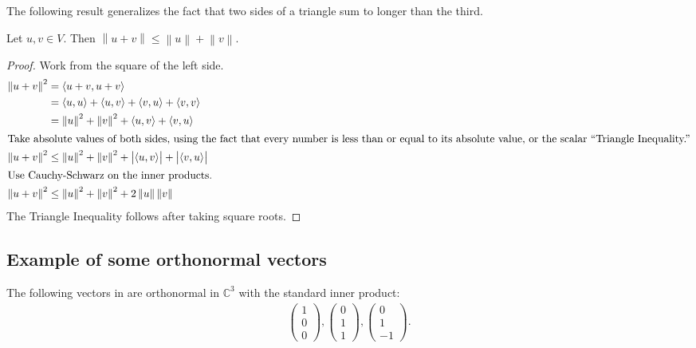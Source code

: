 The following result generalizes the fact that two sides of a triangle sum to longer than the third.
\begin{theorem}
Let \(u, v \in V\). Then \(\left\|u+v\right\| \leq \left\|u\right\| + \left\|v\right\|\).
\end{theorem}
\begin{proof}
  Work from the square of the left side.
  \begin{align}
    \left\|u + v\right\|^2
    &= \left\langle u + v, u + v\right\rangle\\
    &= \left\langle u, u\right\rangle + \left\langle u, v\right\rangle
     + \left\langle v, u\right\rangle + \left\langle v, v\right\rangle\\
    &= \left\|u\right\|^2 + \left\|v\right\|^2
      + \left\langle u, v\right\rangle
      + \left\langle v, u\right\rangle\\
    \intertext{Take absolute values of both sides, using the fact that every number is less than or equal to its absolute value, or the scalar ``Triangle Inequality.''}
    \left\|u + v\right\|^2
    &\leq
    \left\|u\right\|^2 + \left\|v\right\|^2
      + \left|\left\langle u, v\right\rangle\right|
      + \left|\left\langle v, u\right\rangle\right|\\
    \intertext{Use Cauchy-Schwarz on the inner products.}
    \left\|u + v\right\|^2
    &\leq
    \left\|u\right\|^2 + \left\|v\right\|^2
    + 2\left\|u\right\|\left\|v\right\|
  \end{align}
  The Triangle Inequality follows after taking square roots.
\end{proof}

\subsection{Example of some orthonormal vectors}
The following vectors in are orthonormal in \(\mathbb{C}^3\) with the standard inner product:
\begin{align*}
  \begin{pmatrix}
    1 \\ 0 \\ 0
  \end{pmatrix},
  \begin{pmatrix}
    0 \\ 1 \\ 1
  \end{pmatrix},
  \begin{pmatrix}
    0 \\ 1 \\ -1
  \end{pmatrix}.
\end{align*}

